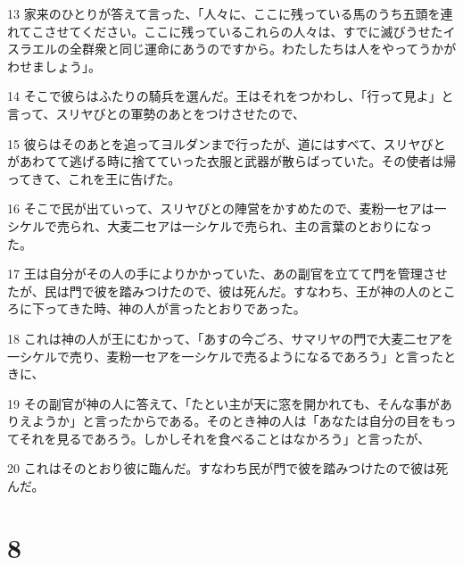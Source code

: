 \par 13 家来のひとりが答えて言った、「人々に、ここに残っている馬のうち五頭を連れてこさせてください。ここに残っているこれらの人々は、すでに滅びうせたイスラエルの全群衆と同じ運命にあうのですから。わたしたちは人をやってうかがわせましょう」。
\par 14 そこで彼らはふたりの騎兵を選んだ。王はそれをつかわし、「行って見よ」と言って、スリヤびとの軍勢のあとをつけさせたので、
\par 15 彼らはそのあとを追ってヨルダンまで行ったが、道にはすべて、スリヤびとがあわてて逃げる時に捨てていった衣服と武器が散らばっていた。その使者は帰ってきて、これを王に告げた。
\par 16 そこで民が出ていって、スリヤびとの陣営をかすめたので、麦粉一セアは一シケルで売られ、大麦二セアは一シケルで売られ、主の言葉のとおりになった。
\par 17 王は自分がその人の手によりかかっていた、あの副官を立てて門を管理させたが、民は門で彼を踏みつけたので、彼は死んだ。すなわち、王が神の人のところに下ってきた時、神の人が言ったとおりであった。
\par 18 これは神の人が王にむかって、「あすの今ごろ、サマリヤの門で大麦二セアを一シケルで売り、麦粉一セアを一シケルで売るようになるであろう」と言ったときに、
\par 19 その副官が神の人に答えて、「たとい主が天に窓を開かれても、そんな事がありえようか」と言ったからである。そのとき神の人は「あなたは自分の目をもってそれを見るであろう。しかしそれを食べることはなかろう」と言ったが、
\par 20 これはそのとおり彼に臨んだ。すなわち民が門で彼を踏みつけたので彼は死んだ。

\chapter{8}

